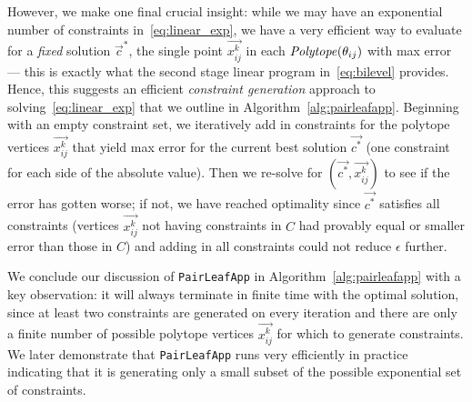 However, we make one final crucial insight: while we may have an
exponential number of constraints in~\eqref{eq:linear_exp}, we have a
very efficient way to evaluate for a \emph{fixed} solution
$\vec{c}^*$, the single point $\vec{x_{ij}^k}$ in each
$\mathit{Polytope}(\theta_{ij})$ with max error --- this is exactly what the second
stage linear program in~\eqref{eq:bilevel} provides.  Hence, this
suggests an efficient \emph{constraint generation} approach to
solving~\eqref{eq:linear_exp} that we outline in
Algorithm~\ref{alg:pairleafapp}.  Beginning with an empty constraint
set, we iteratively add in constraints for the polytope vertices
$\vec{x_{ij}^k}$ that yield max error for the current best solution
$\vec{c^*}$ (one constraint for each side of the absolute value).
Then we re-solve for $(\vec{c^*},\vec{x_{ij}^k})$ to see if the error
has gotten worse; if not, we have reached optimality since $\vec{c^*}$
satisfies all constraints (vertices $\vec{x_{ij}^k}$ not having
constraints in $C$ had provably equal or smaller error than those in
$C$) and adding in all constraints could not reduce $\epsilon$
further.

We conclude our discussion of \texttt{PairLeafApp} in
Algorithm~\ref{alg:pairleafapp} with a key observation: it will always
terminate in finite time with the optimal solution, since at least two
constraints are generated on every iteration and there are only a
finite number of possible polytope vertices $\vec{x_{ij}^k}$ for which
to generate constraints.  We later demonstrate that
\texttt{PairLeafApp} runs very efficiently in practice indicating 
that it is generating only a small subset of the possible
exponential set of constraints.
